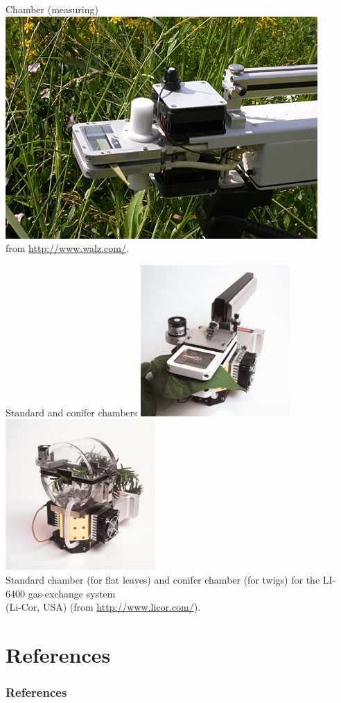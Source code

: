 \documentclass[10pt]{beamer}\usepackage[]{graphicx}\usepackage[]{color}
\begin{document}
\begin{frame}{Chamber (measuring)}
    \centering
    \includegraphics[height=0.7\textheight]{photos/gFS-3000_4big}\\
    {\small from \url{http://www.walz.com/}.}
\end{frame}

\begin{frame}{Standard and conifer chambers}
    \centering
    \includegraphics[height=0.5\textheight]{photos/LI-6400-standard}%
    \includegraphics[height=0.5\textheight]{photos/LI-6400-conifer}\\
    {\small Standard chamber (for flat leaves) and conifer chamber (for twigs)
     for the LI-6400 gas-exchange system\\
     (Li-Cor, USA) (from \url{http://www.licor.com/}).}
\end{frame}


\section*{References}
  \nocite{Kotilainen2020}
  \begin{frame}[t,allowframebreaks]
    \frametitle{References}
    \printbibliography
  \end{frame}
\end{document}
